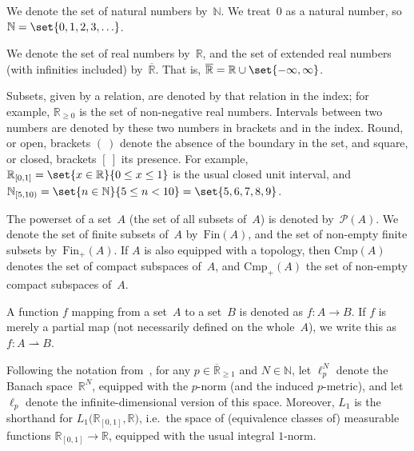\documentclass[11pt]{article}
\theoremstyle{plain}
\theoremstyle{definition}
\newcommand{\some}[1]{\exists #1 .\,}  %
\newcommand{\pst}{\mathcal{P}}  %
\newcommand{\NN}{\mathbb{N}}
\newcommand{\RR}{\mathbb{R}}
\newcommand{\intcc}[3][\RR]{{#1}_{[#2, #3]}}
\newcommand{\intco}[3][\RR]{{#1}_{[#2, #3)}}
\newcommand{\er}{\overline{\RR}}
\newcommand{\parto}{\mathrel{\rightharpoonup}}  %
\newcommand{\fsub}{\mathrm{Fin}}
\newcommand{\ifsub}{\fsub_{+}}
\newcommand{\csub}{\mathrm{Cmp}}
\newcommand{\icsub}{\csub_{+}}
\begin{document}
We denote the set of natural numbers by~$\NN$. We treat~$0$ as a natural number, so $\NN = \set{0, 1, 2, 3,\ldots}$.

We denote the set of real numbers by~$\RR$, and the set of extended real numbers (with infinities included) by~$\er$. That is, $\er = \RR \cup \set{-\infty, \infty}$.

Subsets, given by a relation, are denoted by that relation in the index; for example, $\RR_{\geq 0}$ is the set of non-negative real numbers. Intervals between two numbers are denoted by these two numbers in brackets and in the index. Round, or open, brackets $(\ )$ denote the absence of the boundary in the set, and square, or closed, brackets $[\ ]$ its presence. For example, $\intcc{0}{1} = \set{x \in \RR}{0 \leq x \leq 1}$ is the usual closed unit interval, and $\intco[\NN]{5}{10} = \set{n \in \NN}{5 \leq n < 10} = \set{5, 6, 7, 8, 9}$.

The powerset of a set~$A$ (the set of all subsets of~$A$) is denoted by~$\pst(A)$. We denote the set of finite subsets of~$A$ by~$\fsub(A)$, and the set of non-empty finite subsets by~$\ifsub(A)$. If $A$ is also equipped with a topology, then $\csub(A)$ denotes the set of compact subspaces of~$A$, and $\icsub(A)$ the set of non-empty compact subspaces of~$A$.

A function $f$ mapping from a set~$A$ to a set~$B$ is denoted as $f\colon A \to B$. If $f$ is merely a partial map (not necessarily defined on the whole~$A$), we write this as $f\colon A \parto B$.


Following the notation from~\cite{leinster2023spaces}, for any $p \in \er_{\geq 1}$ and $N \in \NN$, let $\ell_p^N$ denote the Banach space~$\RR^N$, equipped with the $p$-norm (and the induced $p$-metric), and let $\ell_p$ denote the infinite-dimensional version of this space. Moreover, $L_1$ is the shorthand for $L_1\big(\intcc{0}{1}, \RR\big)$, i.e.\ the space of (equivalence classes of) measurable functions $\intcc{0}{1} \to \RR$, equipped with the usual integral $1$-norm.
\end{document}
